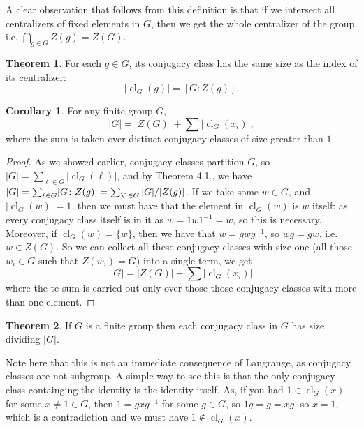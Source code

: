 \documentclass[9pt,reqno]{amsart}
\theoremstyle{definition}
\newtheorem{theorem}{Theorem}[section]
\newtheorem{rem}{Remark}[section]
\newtheorem{coro}{Corollary}[section]
\DeclareMathOperator{\cl}{cl}
\begin{document}
A clear observation that follows from this definition is that if we intersect all centralizers of fixed elements in $G$, then we get the whole centralizer of the group, i.e. $\bigcap_{g \in G} Z(g) = Z(G)$. 
\begin{theorem}
	For each $g \in G$, its conjugacy class has the same size as the index of its centralizer:
	$$| \cl_G (g) | = [G \colon Z(g) ].$$
\end{theorem}
\begin{coro}
For any finite group $G$,  $$ |G| = |Z(G)| + \sum |\cl_G(x_i)|,$$ where the sum is taken over distinct conjugacy classes of size greater than $1$.
\end{coro}
\begin{proof}
	As we showed earlier, conjugacy classes partition $G$, so $|G| = \sum_{ \ell \in G} |\cl_G ( \ell)|$, and by Theorem 4.1., we have $|G| = \sum_{ \ell \in G} [G \colon Z(g) ] = \sum_{\l \in G } |G|/ |Z(g)|$. If we take some $w \in G$, and $ | \cl_G(w) | = 1$, then we must have that the element in $\cl_G(w) $ is $w$ itself: as every conjugacy class itself is in it as $w = 1 w 1^{-1} = w$, so this is necessary. Moreover, if $\cl_G( w) = \{ w \}$, then we have that $w = gwg^{-1}$, so $w g = gw$, i.e. $w \in Z(G)$. So we can collect all these conjugacy classes with size one (all those $w_i \in G$ such that $Z(w_i) = G$) into a single term, we get $$|G| = |Z(G)| + \sum |\cl_G(x_i)|$$ where the te sum is carried out only over those those conjugacy classes with more than one element. 
\end{proof}
\begin{theorem}
	If $G$ is a finite group then each conjugacy class in $G$ has size dividing $|G|$.
\end{theorem}
Note here that this is not an immediate consequence of Langrange, as conjugacy classes are not subgroup. A simple way to see this is that the only conjugacy class containging the identity is the identity itself. As, if you had $1 \in \cl_G(x)$ for some $x \neq 1 \in G$, then $1 = gxg^{-1}$ for some $g \in G$, so $1g = g = xg$, so $x = 1$, which is a contradiction and we must have $1 \notin \cl_G (x)$.  
\end{document}
